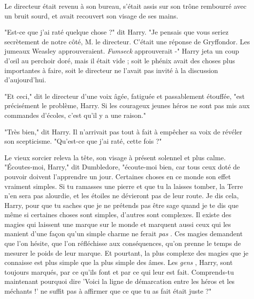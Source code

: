 Le directeur était revenu à son bureau, s'était assis sur son trône rembourré avec un bruit sourd, et avait recouvert son visage de ses mains.

"Est-ce que j'ai raté quelque chose ?" dit Harry. "Je pensais que vous seriez secrètement de notre côté, M. le directeur. C'était une réponse de Gryffondor. Les jumeaux Weasley approuveraient. \emph{Fumseck}  approuverait -" Harry jeta un coup d'œil au perchoir doré, mais il était vide ; soit le phénix avait des choses plus importantes à faire, soit le directeur ne l'avait pas invité à la discussion d'aujourd'hui.

"Et ceci," dit le directeur d'une voix âgée, fatiguée et passablement étouffée, "est précisément le problème, Harry. Si les courageux jeunes héros ne sont pas mis aux commandes d'écoles, c'est qu'il y a une raison."

"Très bien," dit Harry. Il n'arrivait pas tout à fait à empêcher sa voix de révéler son scepticisme. "Qu'est-ce que j'ai raté, cette fois ?"

Le vieux sorcier releva la tête, son visage à présent solennel et plus calme. "Écoutes-moi, Harry," dit Dumbledore, "écoute-moi bien, car tous ceux doté de pouvoir doivent l'apprendre un jour. Certaines choses en ce monde son effet vraiment simples. Si tu ramasses une pierre et que tu la laisses tomber, la Terre n'en sera pas alourdie, et les étoiles ne dévieront pas de leur route. Je dis cela, Harry, pour que tu saches que je ne prétends pas être sage quand je te dis que même si certaines choses sont simples, d'autres sont complexes. Il existe des magies qui laissent une marque sur le monde et marquent aussi ceux qui les manient d'une façon qu'un simple charme ne ferait \emph{pas} . Ces magies demandent que l'on hésite, que l'on réfléchisse aux conséquences, qu'on prenne le temps de mesurer le poids de leur marque. Et pourtant, la plus complexe des magies que je connaisse est plus simple que la plus simple des âmes. Les \emph{gens} , Harry, sont toujours marqués, par ce qu'ils font et par ce qui leur est fait. Comprends-tu maintenant pourquoi dire 'Voici la ligne de démarcation entre les héros et les méchants !' ne suffit pas à affirmer que ce que tu as fait était juste ?"

